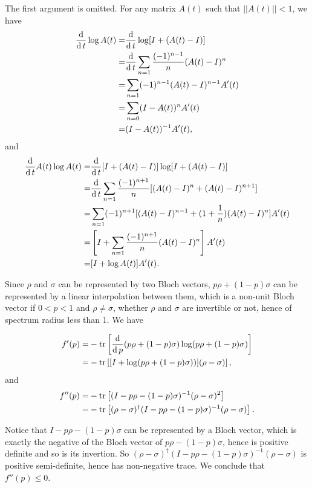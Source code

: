 \ex The first argument is omitted.
For any matrix $A(t)$ such that $||A(t)||<1$, we have
$$\begin{aligned}
    \frac{\operatorname{d}}{\operatorname{d} t}\log A(t) = & \frac{\operatorname{d}}{\operatorname{d} t}\log[I+(A(t)-I)]
    \\ = & \frac{\operatorname{d}}{\operatorname{d} t}\sum_{n=1}\frac{(-1)^{n-1}}{n}(A(t)-I)^n
    \\ = & \sum_{n=1}(-1)^{n-1}(A(t)-I)^{n-1}A'(t)
    \\ = & \sum_{n=0}(I-A(t))^n A'(t)
    \\ = & (I - A(t))^{-1}A'(t),
\end{aligned}$$
and
$$\begin{aligned}
    \frac{\operatorname{d}}{\operatorname{d} t}A(t)\log A(t) = & \frac{\operatorname{d}}{\operatorname{d} t}[I+(A(t)-I)]\log[I+(A(t)-I)]
    \\ = & \frac{\operatorname{d}}{\operatorname{d} t}\sum_{n=1}\frac{(-1)^{n+1}}{n}[(A(t)-I)^n+(A(t)-I)^{n+1}]
    \\ = & \sum_{n=1}(-1)^{n+1}[(A(t)-I)^{n-1}+(1+\frac{1}{n})(A(t)-I)^n]A'(t)
    \\ = & \left[I + \sum_{n=1}\frac{(-1)^{n+1}}{n}(A(t)-I)^n\right]A'(t)
    \\ = & [I + \log A(t)]A'(t).
\end{aligned}$$

Since $\rho$ and $\sigma$ can be represented by two Bloch vectors, $p\rho+(1-p)\sigma$ can be represented by a linear interpolation between them, which is a non-unit Bloch vector if $0<p<1$ and $\rho\neq\sigma$, whether $\rho$ and $\sigma$ are invertible or not, hence of spectrum radius less than 1.
We have

$$\begin{aligned}
    f'(p) = & -\operatorname{tr}\left[\frac{\operatorname{d}}{\operatorname{d} p}(p\rho+(1-p)\sigma)\log(p\rho+(1-p)\sigma)\right]
    \\ = & -\operatorname{tr}\left[[I + \log(p\rho+(1-p)\sigma))](\rho-\sigma)\right],
\end{aligned}$$
and
$$\begin{aligned}
    f''(p) = & -\operatorname{tr}\left[(I-p\rho-(1-p)\sigma)^{-1}(\rho-\sigma)^2\right]
    \\ = & -\operatorname{tr}\left[(\rho-\sigma)^\dagger(I-p\rho-(1-p)\sigma)^{-1}(\rho-\sigma)\right].
\end{aligned}$$

Notice that $I-p\rho-(1-p)\sigma$ can be represented by a Bloch vector, which is exactly the negative of the Bloch vector of $p\rho-(1-p)\sigma$, hence is positive definite and so is its invertion.
So $(\rho-\sigma)^\dagger(I-p\rho-(1-p)\sigma)^{-1}(\rho-\sigma)$ is positive semi-definite, hence has non-negative trace.
We conclude that $f''(p) \le 0$.